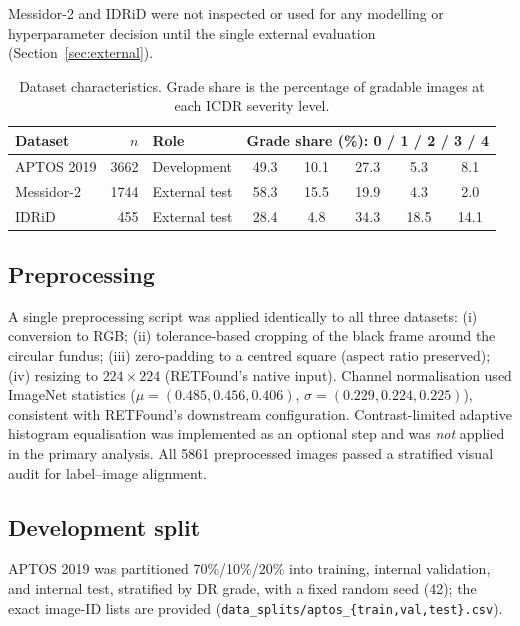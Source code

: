 \documentclass[11pt,a4paper]{article}
\begin{document}
Messidor-2 and IDRiD were not inspected or used for any modelling or
hyperparameter decision until the single external evaluation
(Section~\ref{sec:external}).

\begin{table}[t]
\centering
\caption{Dataset characteristics. Grade share is the percentage of gradable
images at each ICDR severity level.}
\label{tab:datasets}
\small
\begin{tabular}{lrlccccc}
\toprule
Dataset & $n$ & Role & \multicolumn{5}{c}{Grade share (\%): 0 / 1 / 2 / 3 / 4} \\
\midrule
APTOS 2019 & \num{3662} & Development   & 49.3 & 10.1 & 27.3 & 5.3 & 8.1 \\
Messidor-2 & \num{1744} & External test & 58.3 & 15.5 & 19.9 & 4.3 & 2.0 \\
IDRiD      & 455        & External test & 28.4 & 4.8  & 34.3 & 18.5 & 14.1 \\
\bottomrule
\end{tabular}
\end{table}

\subsection{Preprocessing}

A single preprocessing script was applied identically to all three datasets:
(i) conversion to RGB; (ii) tolerance-based cropping of the black frame around
the circular fundus; (iii) zero-padding to a centred square (aspect ratio
preserved); (iv) resizing to $224\times224$ (RETFound's native input). Channel
normalisation used ImageNet statistics ($\mu=(0.485,0.456,0.406)$,
$\sigma=(0.229,0.224,0.225)$), consistent with RETFound's downstream
configuration. Contrast-limited adaptive histogram equalisation was implemented
as an optional step and was \emph{not} applied in the primary analysis. All
\num{5861} preprocessed images passed a stratified visual audit for
label--image alignment.

\subsection{Development split}

APTOS 2019 was partitioned 70\%/10\%/20\% into training, internal validation,
and internal test, stratified by DR grade, with a fixed random seed (42); the
exact image-ID lists are provided
(\texttt{data\_splits/aptos\_\{train,val,test\}.csv}).
\end{document}
